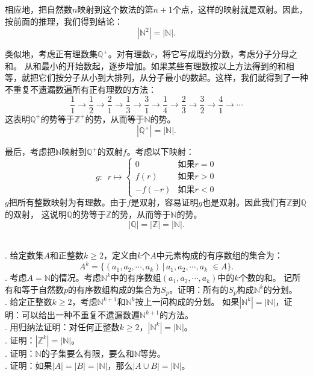 \documentclass[12pt,UTF8,fontset=none]{ctexbook}
\begin{document}
相应地，把自然数$n$映射到这个数法的第$n+1$个点，这样的映射就是双射。因此，按前面的推理，我们得到结论：
$$ |\mathbb{N}^2| = |\mathbb{N}|.$$

类似地，考虑正有理数集$\mathbb{Q}^+$。对有理数$r$，将它写成既约分数，考虑分子分母之和。
从和最小的开始数起，逐步增加。如果某些有理数按以上方法得到的和相等，就把它们按分子从小到大排列，从分子最小的数起。这样，我们就得到了一种不重复不遗漏数遍所有正有理数的方法：
$$ \frac{1}{1} \rightarrow \frac{1}{2} \rightarrow \frac{2}{1} \rightarrow \frac{1}{3} \rightarrow \frac{3}{1} \rightarrow \frac{1}{4} \rightarrow \frac{2}{3} \rightarrow \frac{3}{2} \rightarrow \frac{4}{1} \rightarrow \cdots$$
这表明$\mathbb{Q}^+$的势等于$\mathbb{Z}^+$的势，从而等于$\mathbb{N}$的势。
$$ |\mathbb{Q}^+| = |\mathbb{N}|.$$

最后，考虑把$\mathbb{N}$映射到$\mathbb{Q}^+$的双射$f$。考虑以下映射：
$$ g:\,\,\,r\mapsto \left\{
    \begin{array}{cl}
        0 & \mbox{如果}r = 0 \\
        f(r) & \mbox{如果}r > 0 \\
        -f(-r)  & \mbox{如果}r < 0 
    \end{array}\right.
$$
$g$把所有整数映射为有理数。由于$f$是双射，容易证明$g$也是双射。因此我们有$\mathbb{Z}$到$\mathbb{Q}$的双射，
这说明$\mathbb{Q}$的势等于$\mathbb{Z}$的势，从而等于$\mathbb{N}$的势。
$$ |\mathbb{Q}| = |\mathbb{Z}| = |\mathbb{N}|.$$



\begin{xt}
    \mbox{} \\
    . 给定数集$A$和正整数$k\geqslant 2$，定义由$k$个$A$中元素构成的有序数组的集合为：
    $$ A^k = \{(a_1, a_2, \cdots, a_k) \, | \, a_1, a_2, \cdots, a_k \,\, \in A \}.$$
    . 考虑$A = \mathbb{N}$的情况。考虑$\mathbb{N}^k$中的有序数组$(a_1, a_2, \cdots, a_k)$中的$k$个数的和。
    记所有和等于自然数$p$的有序数组构成的集合为$S_p$。证明：所有的$S_p$构成$\mathbb{N}^k$的分划。\\
    . 给定正整数$k\geqslant 2$，考虑$\mathbb{N}^{k+1}$和$\mathbb{N}^{k}$按上一问构成的分划。
    如果$|\mathbb{N}^k| = |\mathbb{N}|$，证明：可以给出一种不重复不遗漏数遍$\mathbb{N}^{k+1}$的方法。\\
    . 用归纳法证明：对任何正整数$k\geqslant 2$，$|\mathbb{N}^k| = |\mathbb{N}|$。\\
    . 证明：$|\mathbb{Z}^k| = |\mathbb{N}|$。\\
    . 证明：$\mathbb{N}$的子集要么有限，要么和$\mathbb{N}$等势。\\
    . 证明：如果$|A| = |B| = |\mathbb{N}|$，那么$|A\cup B| = |\mathbb{N}|$。
\end{xt}
\end{document}
